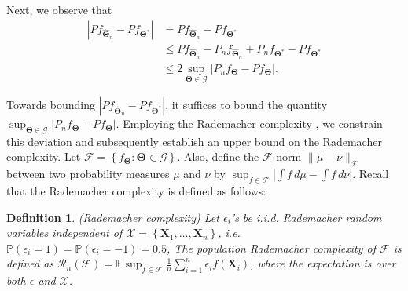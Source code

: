 \documentclass[12pt]{article}
\newcommand{\E}{\mathbb{E}}
\newtheorem{defn}{Definition}
\begin{document}
Next, we observe that
\begin{align*}
    |P f_{\widehat{\bm{\Theta}}_n}- P f_{\bm{\Theta^*}}|
    &= P f_{\widehat{\bm{\Theta}}_n}- P f_{\bm{\Theta^*}}\\
    &\le P f_{\widehat{\bm{\Theta}}_n}-P_n f_{\widehat{\bm{\Theta}}_n}+P_n f_{\bm{\Theta^*}} - P f_{\bm{\Theta^*}}\\
    &\le 2\sup_{\bm{\Theta}\in \mathscr{G}}|P_n f_{\bm\Theta}-P f_{\bm\Theta}|.
\end{align*}

Towards bounding $|P f_{\widehat{\bm{\Theta}}_n}-P f_{\bm{\Theta}^*}|$, it suffices to bound the quantity $\sup _{\bm{\Theta} \in\mathscr{G}}\left|P_n f_{\bm\Theta} - P f_{\bm\Theta}\right|$. Employing the Rademacher complexity \cite{DUDLEY1967290,FoML-mohri}, we constrain this deviation and subsequently establish an upper bound on the Rademacher complexity. Let $\mathcal{F}=\left\{f_{\bm\Theta}: \bm{\Theta} \in\mathscr{G}\right\}$. Also, define the $\mathcal{F}$-norm $\|\mu-\nu\|_{\mathcal{F}}$ between two probability measures $\mu$ and $\nu$ \cite{athreya2006measure} by $ \sup_{f \in \mathcal{F}}\left|\int f \,d\mu-\int f \,d\nu\right|$. Recall that the Rademacher complexity is defined as follows:

\begin{defn}
    (Rademacher complexity) Let $\epsilon_i$'s be i.i.d. Rademacher random variables independent of $\mathcal{X}=\left\{\boldsymbol{X}_1, \ldots, \boldsymbol{X}_n\right\}$, i.e. $\mathbb{P}\left(\epsilon_i=1\right)=\mathbb{P}\left(\epsilon_i=-1\right)=0.5$, The population Rademacher complexity of $\mathcal{F}$ is defined as $\mathcal{R}_n(\mathcal{F})=\E\sup _{f \in \mathcal{F}} \frac{1}{n} \sum_{i=1}^n \epsilon_i f\left(\boldsymbol{X}_i\right)$, where the expectation is over both $\epsilon$ and $\mathcal{X}$.
\end{defn}
\end{document}
